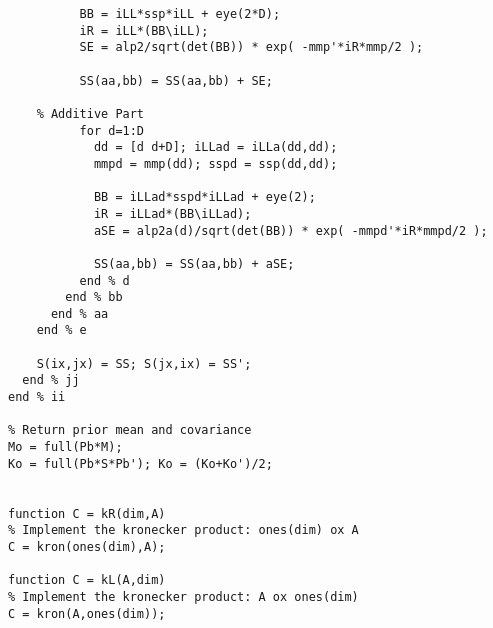 \begin{lstlisting}
          BB = iLL*ssp*iLL + eye(2*D);
          iR = iLL*(BB\iLL);
          SE = alp2/sqrt(det(BB)) * exp( -mmp'*iR*mmp/2 );
          
          SS(aa,bb) = SS(aa,bb) + SE;
          
    % Additive Part
          for d=1:D
            dd = [d d+D]; iLLad = iLLa(dd,dd);
            mmpd = mmp(dd); sspd = ssp(dd,dd);
          
            BB = iLLad*sspd*iLLad + eye(2);
            iR = iLLad*(BB\iLLad);
            aSE = alp2a(d)/sqrt(det(BB)) * exp( -mmpd'*iR*mmpd/2 );
          
            SS(aa,bb) = SS(aa,bb) + aSE;
          end % d
        end % bb
      end % aa
    end % e
    
    S(ix,jx) = SS; S(jx,ix) = SS';
  end % jj
end % ii

% Return prior mean and covariance
Mo = full(Pb*M);
Ko = full(Pb*S*Pb'); Ko = (Ko+Ko')/2;


function C = kR(dim,A)
% Implement the kronecker product: ones(dim) ox A
C = kron(ones(dim),A);

function C = kL(A,dim)
% Implement the kronecker product: A ox ones(dim)
C = kron(A,ones(dim));

\end{lstlisting}


